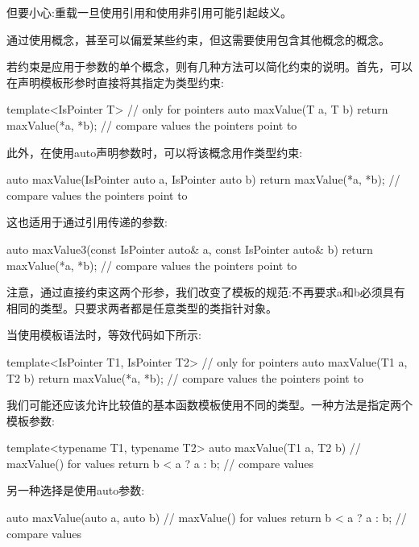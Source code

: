 但要小心:重载一旦使用引用和使用非引用可能引起歧义。

通过使用概念，甚至可以偏爱某些约束，但这需要使用包含其他概念的概念。


若约束是应用于参数的单个概念，则有几种方法可以简化约束的说明。首先，可以在声明模板形参时直接将其指定为类型约束:

\begin{cpp}
template<IsPointer T> // only for pointers
auto maxValue(T a, T b)
{
	return maxValue(*a, *b); // compare values the pointers point to
}
\end{cpp}

此外，在使用auto声明参数时，可以将该概念用作类型约束:

\begin{cpp}
auto maxValue(IsPointer auto a, IsPointer auto b)
{
	return maxValue(*a, *b); // compare values the pointers point to
}
\end{cpp}

这也适用于通过引用传递的参数:

\begin{cpp}
auto maxValue3(const IsPointer auto& a, const IsPointer auto& b)
{
	return maxValue(*a, *b); // compare values the pointers point to
}
\end{cpp}

注意，通过直接约束这两个形参，我们改变了模板的规范:不再要求a和b必须具有相同的类型。只要求两者都是任意类型的类指针对象。

当使用模板语法时，等效代码如下所示:

\begin{cpp}
template<IsPointer T1, IsPointer T2> // only for pointers
auto maxValue(T1 a, T2 b)
{
	return maxValue(*a, *b); // compare values the pointers point to
}
\end{cpp}

我们可能还应该允许比较值的基本函数模板使用不同的类型。一种方法是指定两个模板参数:

\begin{cpp}
template<typename T1, typename T2>
auto maxValue(T1 a, T2 b) // maxValue() for values
{
	return b < a ? a : b; // compare values
}
\end{cpp}

另一种选择是使用auto参数:

\begin{cpp}
auto maxValue(auto a, auto b) // maxValue() for values
{
	return b < a ? a : b; // compare values
}
\end{cpp}

